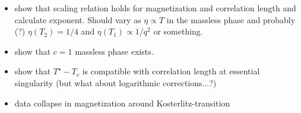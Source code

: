 \begin{itemize}
  \item show that scaling relation holds for magnetization and correlation length and calculate exponent. Should vary as
  $\eta \propto T$ in the massless phase and probably (?) $\eta(T_2) = 1/4$ and $\eta(T_1) \propto 1/q^2$ or something.
  \item show that $c = 1$ massless phase exists.
  \item show that $T^{\star} - T_c$ is compatible with correlation length at essential singularity (but what about
  logarithmic corrections...?)
  \item data collapse in magnetization around Kosterlitz-transition
\end{itemize}
